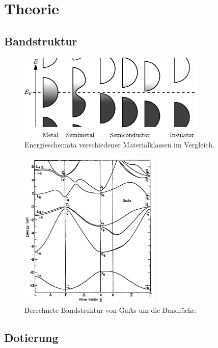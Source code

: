\section[Theorie]{Theorie \textnormal{\cite{faraday}}}
\label{sec:theorie}

\subsection{Bandstruktur}

\begin{figure}
    \centering
    \includegraphics[width=0.8\textwidth]{content/grafik/bandstructure.pdf}
    \caption{Energieschemata verschiedener Materialklassen im Vergleich. \cite{wiki_band}}
    \label{fig:baender}
\end{figure}

\begin{figure}
    \centering
    \includegraphics[width=0.6\textwidth]{content/grafik/bandstruktur.jpg}
    \caption{Berechnete Bandstruktur von GaAs um die Bandlücke. \cite{coh_jam_el}}
    \label{fig:band}
\end{figure}

\subsection{Dotierung}

